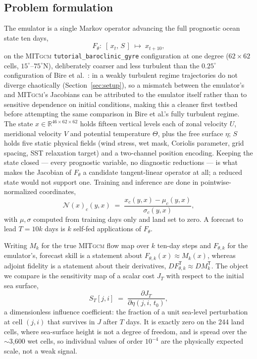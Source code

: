 \documentclass[3p,12pt]{elsarticle}
\newcommand{\MITgcm}{\textsc{MITgcm}}
\begin{document}
\subsection{Problem formulation}
\label{sec:formulation}

The emulator is a single Markov operator advancing the full prognostic ocean
state ten days,
\[
F_\theta:\;[\,x_t,\,S\,]\;\longmapsto\;x_{t+10},
\]
on the \MITgcm{} \texttt{tutorial\_baroclinic\_gyre} configuration at one degree
($62\times62$ cells, $15^\circ$--$75^\circ$N), deliberately coarser and less
turbulent than the $0.25^\circ$ configuration of Bire et al.~\cite{Bire2025}: in
a weakly turbulent regime trajectories do not diverge chaotically
(Section~\ref{sec:setup}), so a mismatch between the emulator's and
\MITgcm{}'s Jacobians can be attributed to the emulator itself rather than to
sensitive dependence on initial conditions, making this a cleaner first
testbed before attempting the same comparison in Bire et al.'s fully turbulent
regime. The state
$x\in\mathbb{R}^{46\times62\times62}$ holds fifteen vertical levels each of zonal
velocity $U$, meridional velocity $V$ and potential temperature $\Theta$, plus
the free surface $\eta$; $S$ holds five static physical fields (wind stress, wet
mask, Coriolis parameter, grid spacing, SST relaxation target) and a two-channel
position encoding. Keeping the state closed --- every prognostic variable, no
diagnostic reductions --- is what makes the Jacobian of $F_\theta$ a candidate
tangent-linear operator at all; a reduced state would not support one. Training
and inference are done in pointwise-normalized coordinates,
\[
\mathcal N(x)_c(y,x) \;=\; \frac{x_c(y,x)-\mu_c(y,x)}{\sigma_c(y,x)},
\]
with $\mu,\sigma$ computed from training days only and land set to zero. A
forecast to lead $T=10k$ days is $k$ self-fed applications of $F_\theta$.

Writing $M_k$ for the true \MITgcm{} flow map over $k$ ten-day steps and
$F_{\theta,k}$ for the emulator's, forecast skill is a statement about
$F_{\theta,k}(x)\approx M_k(x)$, whereas adjoint fidelity is a statement about
their derivatives, $DF_{\theta,k}^{\mathsf T}\approx DM_k^{\mathsf T}$. The object we compare is the sensitivity map of a scalar
cost $J_T$ with respect to the initial sea surface,
\begin{equation}
S_T[j,i] \;=\; \frac{\partial J_T}{\partial\eta(j,i,\,t_0)},
\label{eq:sensitivity}
\end{equation}
a dimensionless influence coefficient: the fraction of a unit sea-level
perturbation at cell $(j,i)$ that survives in $J$ after $T$ days. It is exactly
zero on the 244 land cells, where sea-surface height is not a degree of freedom,
and is spread over the $\sim$3{,}600 wet cells, so individual values of order
$10^{-4}$ are the physically expected scale, not a weak signal.
\end{document}
